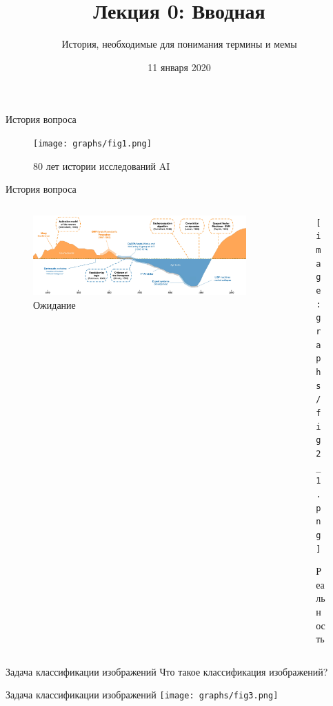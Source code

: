 \documentclass[aspectratio=169]{beamer}
\title{Лекция 0: Вводная}
\subtitle{История, необходимые для понимания термины и мемы}
\date{11 января 2020}
\begin{document}
\maketitle

\begin{frame}{История вопроса}
    \begin{figure}
        \texttt{[image: graphs/fig1.png]}
        \caption{80 лет истории исследований AI}
    \end{figure}
\end{frame}

\begin{frame}{История вопроса}
    \begin{columns}
        \begin{column}{0.48\linewidth}
            \begin{figure}
                \includegraphics[width=0.9\linewidth]{graphs/fig2.jpg}
                \caption{Ожидание}
            \end{figure}
        \end{column}
        \pause{}
        \begin{column}{0.48\linewidth}
            \begin{figure}
                \texttt{[image: graphs/fig2\_1.png]}
                \caption{Реальность}
            \end{figure}
        \end{column}
    \end{columns}
\end{frame}

\begin{frame}{Задача классификации изображений}
    \centering
    \LARGE
    Что такое классификация изображений?
\end{frame}

\begin{frame}{Задача классификации изображений}
    \centering
    \texttt{[image: graphs/fig3.png]}
\end{frame}
\end{document}
